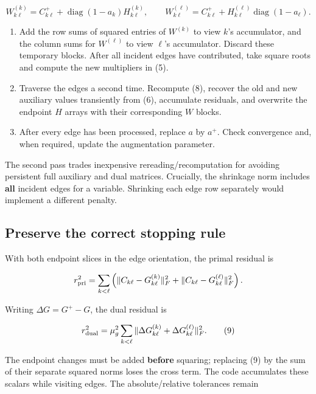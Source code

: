 \documentclass[
  11pt,
]{article}
\providecommand{\tightlist}{%
  \setlength{\itemsep}{0pt}\setlength{\parskip}{0pt}}
\begin{document}
\[
W_{k\ell}^{(k)}=C_{k\ell}^{+}
 +\operatorname{diag}(1-a_k)H_{k\ell}^{(k)},
\qquad
W_{k\ell}^{(\ell)}=C_{k\ell}^{+}
 +H_{k\ell}^{(\ell)}\operatorname{diag}(1-a_\ell).
\tag{8}
\]

\begin{enumerate}
\def\labelenumi{\arabic{enumi}.}
\setcounter{enumi}{3}
\tightlist
\item
  Add the row sums of squared entries of \(W^{(k)}\) to view \(k\)'s
  accumulator, and the column sums for \(W^{(\ell)}\) to view \(\ell\)'s
  accumulator. Discard these temporary blocks. After all incident edges
  have contributed, take square roots and compute the new multipliers in
  (5).
\item
  Traverse the edges a second time. Recompute (8), recover the old and
  new auxiliary values transiently from (6), accumulate residuals, and
  overwrite the endpoint \(H\) arrays with their corresponding \(W\)
  blocks.
\item
  After every edge has been processed, replace \(a\) by \(a^{+}\). Check
  convergence and, when required, update the augmentation parameter.
\end{enumerate}

The second pass trades inexpensive rereading/recomputation for avoiding
persistent full auxiliary and dual matrices. Crucially, the shrinkage
norm includes \textbf{all} incident edges for a variable. Shrinking each
edge row separately would implement a different penalty.

\hypertarget{preserve-the-correct-stopping-rule}{%
\subsection{Preserve the correct stopping
rule}\label{preserve-the-correct-stopping-rule}}

With both endpoint slices in the edge orientation, the primal residual
is

\[
r_{\rm pri}^2=\sum_{k<\ell}
\left(\|C_{k\ell}-G_{k\ell}^{(k)}\|_F^2
+\|C_{k\ell}-G_{k\ell}^{(\ell)}\|_F^2\right).
\]

Writing \(\Delta G=G^{+}-G\), the dual residual is

\[
r_{\rm dual}^2=\mu_g^2\sum_{k<\ell}
\|\Delta G_{k\ell}^{(k)}+\Delta G_{k\ell}^{(\ell)}\|_F^2.
\tag{9}
\]

The endpoint changes must be added \textbf{before} squaring; replacing
(9) by the sum of their separate squared norms loses the cross term. The
code accumulates these scalars while visiting edges. The
absolute/relative tolerances remain
\end{document}
